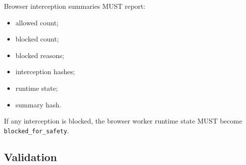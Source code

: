 Browser interception summaries MUST report:

\begin{itemize}
  \item allowed count;
  \item blocked count;
  \item blocked reasons;
  \item interception hashes;
  \item runtime state;
  \item summary hash.
\end{itemize}

If any interception is blocked, the browser worker runtime state MUST become \texttt{blocked\_for\_safety}.

\subsection{Validation}

